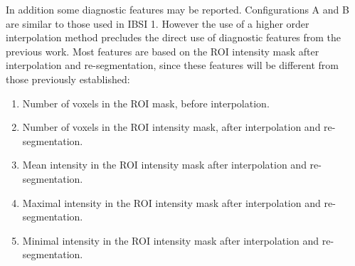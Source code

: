 \documentclass[fleqn,a4paper,oneside,openany]{book}
\newcommand\textid[1]{{\normalsize{\idfont #1}}}
\begin{document}
\begin{enumerate}
\end{enumerate}

In addition some diagnostic features may be reported. Configurations A and B are similar to those used in IBSI 1. However the use of a higher order interpolation method precludes the direct use of diagnostic features from the previous work. Most features are based on the ROI intensity mask after interpolation and re-segmentation, since these features will be different from those previously established:
\begin{enumerate}
    \item Number of voxels in the ROI mask, before interpolation.
    \item Number of voxels in the ROI intensity mask, after interpolation and re-segmentation.
    \item Mean intensity in the ROI intensity mask after interpolation and re-segmentation.
    \item Maximal intensity in the ROI intensity mask after interpolation and re-segmentation.
    \item Minimal intensity in the ROI intensity mask after interpolation and re-segmentation.
\end{enumerate}
\end{document}
